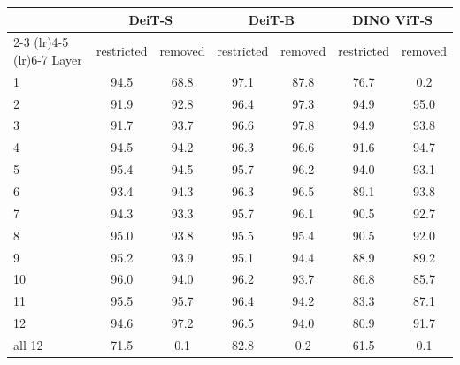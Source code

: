 \small
\setlength{\tabcolsep}{4pt}
\begin{tabular}{lcccccc}
\toprule
 & \multicolumn{2}{c}{DeiT-S} & \multicolumn{2}{c}{DeiT-B} & \multicolumn{2}{c}{DINO ViT-S} \\
\cmidrule(lr){2-3} \cmidrule(lr){4-5} \cmidrule(lr){6-7}
Layer & restricted & removed & restricted & removed & restricted & removed \\
\midrule
1 & 94.5 & 68.8 & 97.1 & 87.8 & 76.7 & 0.2 \\
2 & 91.9 & 92.8 & 96.4 & 97.3 & 94.9 & 95.0 \\
3 & 91.7 & 93.7 & 96.6 & 97.8 & 94.9 & 93.8 \\
4 & 94.5 & 94.2 & 96.3 & 96.6 & 91.6 & 94.7 \\
5 & 95.4 & 94.5 & 95.7 & 96.2 & 94.0 & 93.1 \\
6 & 93.4 & 94.3 & 96.3 & 96.5 & 89.1 & 93.8 \\
7 & 94.3 & 93.3 & 95.7 & 96.1 & 90.5 & 92.7 \\
8 & 95.0 & 93.8 & 95.5 & 95.4 & 90.5 & 92.0 \\
9 & 95.2 & 93.9 & 95.1 & 94.4 & 88.9 & 89.2 \\
10 & 96.0 & 94.0 & 96.2 & 93.7 & 86.8 & 85.7 \\
11 & 95.5 & 95.7 & 96.4 & 94.2 & 83.3 & 87.1 \\
12 & 94.6 & 97.2 & 96.5 & 94.0 & 80.9 & 91.7 \\
\midrule
all 12 & 71.5 & 0.1 & 82.8 & 0.2 & 61.5 & 0.1 \\
\bottomrule
\end{tabular}
